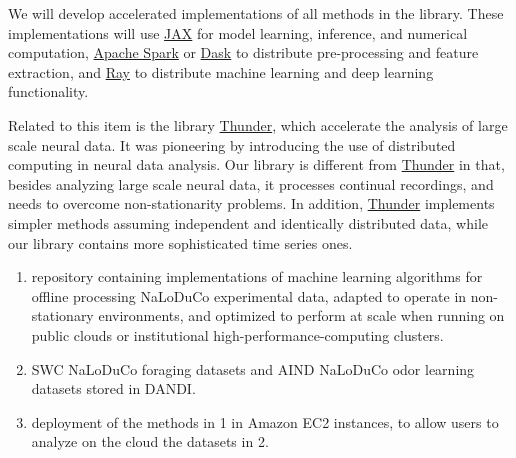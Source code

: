 

We will develop accelerated implementations of all methods in the library.
These implementations will use \href{https://docs.jax.dev/}{JAX} for model
learning, inference, and numerical computation,
\href{https://spark.apache.org/}{Apache Spark} or
\href{https://www.dask.org/}{Dask} to distribute pre-processing and feature
extraction, and \href{https://docs.ray.io/}{Ray} to distribute machine learning
and deep learning functionality.

Related to this item is the library
\href{https://github.com/thunder-project/thunder}{Thunder}, which accelerate the
analysis of large scale neural data. It was pioneering by introducing the use
of distributed computing in neural data analysis.
%
Our library is different from
\href{https://github.com/thunder-project/thunder}{Thunder} in that, besides
analyzing large scale neural data, it processes continual recordings, and needs
to overcome non-stationarity problems.
%
%
In addition, \href{https://github.com/thunder-project/thunder}{Thunder}
implements simpler methods assuming independent and identically distributed
data, while our library contains more sophisticated time series ones.

\label{sec:deliverablesOfflineAnalysis}

\begin{enumerate}

    \item repository containing implementations of machine learning algorithms
        for offline processing NaLoDuCo experimental data, adapted to operate
        in non-stationary environments, and optimized to perform at scale when
        running on public clouds or institutional
        high-performance-computing clusters.

    \item SWC NaLoDuCo foraging datasets and AIND NaLoDuCo odor learning
    datasets stored in DANDI.

    \item deployment of the methods in 1 in Amazon EC2 instances, to allow
        users to analyze on the cloud the datasets in 2.

\end{enumerate}

